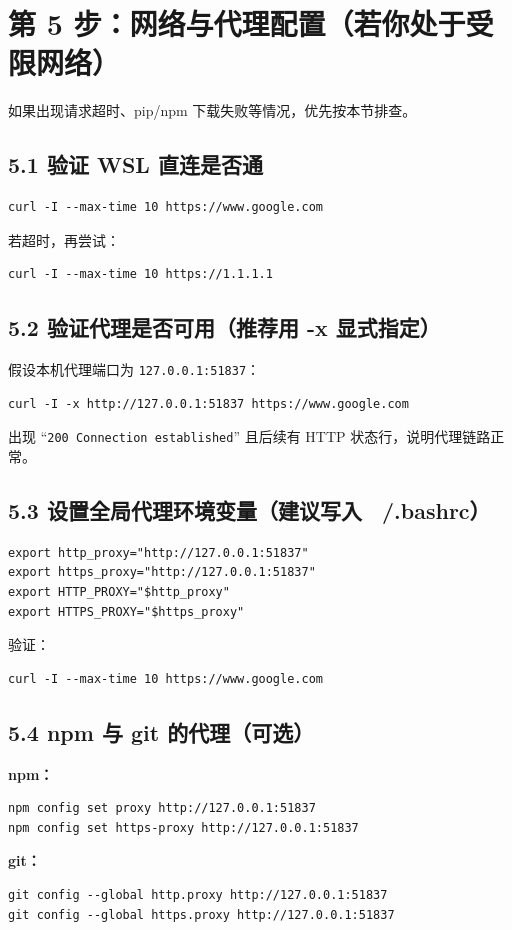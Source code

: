 \documentclass[11pt,a4paper]{article}
\begin{document}
\section{第 5 步：网络与代理配置（若你处于受限网络）}
\label{sec:proxy}
如果出现请求超时、pip/npm 下载失败等情况，优先按本节排查。

\subsection{5.1 验证 WSL 直连是否通}
\begin{lstlisting}
curl -I --max-time 10 https://www.google.com
\end{lstlisting}
若超时，再尝试：
\begin{lstlisting}
curl -I --max-time 10 https://1.1.1.1
\end{lstlisting}

\subsection{5.2 验证代理是否可用（推荐用 -x 显式指定）}
假设本机代理端口为 \texttt{127.0.0.1:51837}：
\begin{lstlisting}
curl -I -x http://127.0.0.1:51837 https://www.google.com
\end{lstlisting}
出现 ``\texttt{200 Connection established}'' 且后续有 HTTP 状态行，说明代理链路正常。

\subsection{5.3 设置全局代理环境变量（建议写入 ~/.bashrc）}
\begin{lstlisting}
export http_proxy="http://127.0.0.1:51837"
export https_proxy="http://127.0.0.1:51837"
export HTTP_PROXY="$http_proxy"
export HTTPS_PROXY="$https_proxy"
\end{lstlisting}
验证：
\begin{lstlisting}
curl -I --max-time 10 https://www.google.com
\end{lstlisting}

\subsection{5.4 npm 与 git 的代理（可选）}
\textbf{npm：}
\begin{lstlisting}
npm config set proxy http://127.0.0.1:51837
npm config set https-proxy http://127.0.0.1:51837
\end{lstlisting}
\textbf{git：}
\begin{lstlisting}
git config --global http.proxy http://127.0.0.1:51837
git config --global https.proxy http://127.0.0.1:51837
\end{lstlisting}
\end{document}
